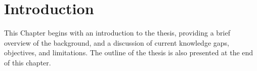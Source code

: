\chapter{Introduction}
This Chapter begins with an introduction to the thesis, providing a brief overview of the background, and a discussion of current knowledge gaps, objectives, and limitations. The outline of the thesis is also presented at the end of this chapter.








